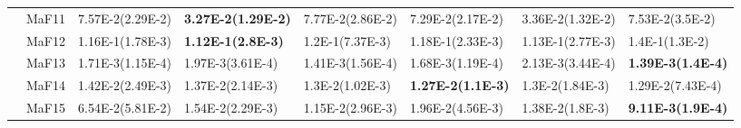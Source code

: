 \documentclass[]{article}
\begin{document}
\begin{landscape}
\begin{table}
\begin{footnotesize}
\begin{tabular}{|l|l|l|l|l|l|l|l|}
 & MaF11 & 7.57E-2(2.29E-2) & \cellcolor{gray95} {\bf 3.27E-2(1.29E-2)} & 7.77E-2(2.86E-2) & 7.29E-2(2.17E-2) & \cellcolor{gray95} 3.36E-2(1.32E-2) & 7.53E-2(3.5E-2)\\
 & MaF12 & \cellcolor{gray95} 1.16E-1(1.78E-3) & \cellcolor{gray95} {\bf 1.12E-1(2.8E-3)} & 1.2E-1(7.37E-3) & 1.18E-1(2.33E-3) & \cellcolor{gray95} 1.13E-1(2.77E-3) & 1.4E-1(1.3E-2)\\
 & MaF13 & 1.71E-3(1.15E-4) & 1.97E-3(3.61E-4) & \cellcolor{gray95} 1.41E-3(1.56E-4) & 1.68E-3(1.19E-4) & 2.13E-3(3.44E-4) & \cellcolor{gray95} {\bf 1.39E-3(1.4E-4)}\\
 & MaF14 & \cellcolor{gray95} 1.42E-2(2.49E-3) & \cellcolor{gray95} 1.37E-2(2.14E-3) & \cellcolor{gray95} 1.3E-2(1.02E-3) & \cellcolor{gray95} {\bf 1.27E-2(1.1E-3)} & \cellcolor{gray95} 1.3E-2(1.84E-3) & \cellcolor{gray95} 1.29E-2(7.43E-4)\\
 & MaF15 & 6.54E-2(5.81E-2) & 1.54E-2(2.29E-3) & \cellcolor{gray95} 1.15E-2(2.96E-3) & 1.96E-2(4.56E-3) & 1.38E-2(1.8E-3) & \cellcolor{gray95} {\bf 9.11E-3(1.9E-4)}\\
\hline
\end{tabular}
\end{footnotesize}
\end{table}
\end{landscape}
\end{document}
